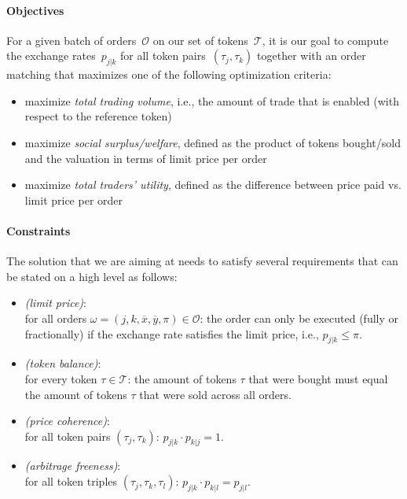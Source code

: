 \documentclass[11pt,parskip=full]{scrartcl}%
\newcommand*{\ie}{i.e., }
\newcommand*{\wrt}{with respect to }
\newcommand*{\tokens}{\mathcal{T}}          %
\newcommand*{\orders}{\mathcal{O}}          %
\begin{document}
\paragraph{Objectives}

For a given batch of orders~$\mathcal{O}$ on our set of tokens~$\mathcal{T}$, it is our goal to
compute the exchange rates~$p_{j|k}$ for all token pairs~$(\tau_j,\tau_k)$ together with an order
matching that maximizes one of the following optimization criteria:
\begin{itemize}
  \item maximize \emph{total trading volume}, \ie the amount of trade that is enabled (\wrt
  the reference token)
  \item maximize \emph{social surplus/welfare}, defined as the product of tokens bought/sold and
  the valuation in terms of limit price per order
  \item maximize \emph{total traders' utility}, defined as the difference between price paid vs.
  limit price per order
\end{itemize}


\paragraph{Constraints}

The solution that we are aiming at needs to satisfy several requirements that can be stated on a
high level as follows:
\begin{itemize}
  \item \emph{(limit price)}:\\
  for all orders
  $ \omega = (j,k,\overline{x},\overline{y},\pi) \in \orders $:
  the order can only be executed (fully or fractionally) if the exchange rate satisfies the
  limit price, \ie $ p_{j|k} \le \pi $.
  \item \emph{(token balance)}:\\
  for every token $ \tau \in \tokens $: the amount of tokens $ \tau $ that were bought must
  equal the amount of tokens $ \tau $ that were sold across all orders.
  \item \emph{(price coherence)}:\\
  for all token pairs $ (\tau_j,\tau_k) $: $ p_{j|k} \cdot p_{k|j} = 1 $.
  \item \emph{(arbitrage freeness)}:\\
  for all token triples $ (\tau_j,\tau_k,\tau_l) $: $ p_{j|k} \cdot p_{k|l} = p_{j|l} $.
\end{itemize}
\end{document}
